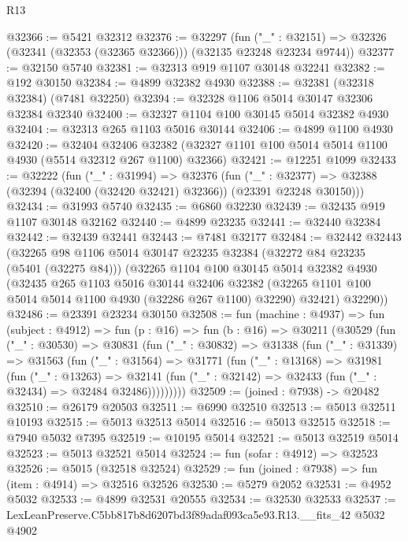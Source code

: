 \begin{lexlean}{R13}
\begin{coremodule}
@32366 := @5421 @32312
@32376 := @32297
    (fun ("_" : @32151) => @32326 (@32341 (@32353 (@32365 @32366))) (@32135 @23248 @23234 @9744))
@32377 := @32150 @5740
@32381 := @32313 @919 @1107 @30148 @32241
@32382 := @192 @30150
@32384 := @4899 @32382 @4930
@32388 := @32381 (@32318 @32384) (@7481 @32250)
@32394 := @32328 @1106 @5014 @30147 @32306 @32384 @32340
@32400 := @32327 @1104 @100 @30145 @5014 @32382 @4930
@32404 := @32313 @265 @1103 @5016 @30144
@32406 := @4899 @1100 @4930
@32420 := @32404
    @32406
    @32382
    (@32327 @1101 @100 @5014 @5014 @1100 @4930 (@5514 @32312 @267 @1100) @32366)
@32421 := @12251 @1099
@32433 := @32222
    (fun ("_" : @31994) =>
    @32376
      (fun ("_" : @32377) =>
      @32388 (@32394 (@32400 (@32420 @32421) @32366)) (@23391 @23248 @30150)))
@32434 := @31993 @5740
@32435 := @6860 @32230
@32439 := @32435 @919 @1107 @30148 @32162
@32440 := @4899 @23235
@32441 := @32440 @32384
@32442 := @32439 @32441
@32443 := @7481 @32177
@32484 := @32442
    @32443
    (@32265
      @98
      @1106
      @5014
      @30147
      @23235
      @32384
      (@32272 @84 @23235 (@5401 (@32275 @84)))
      (@32265
        @1104
        @100
        @30145
        @5014
        @32382
        @4930
        (@32435
          @265
          @1103
          @5016
          @30144
          @32406
          @32382
          (@32265 @1101 @100 @5014 @5014 @1100 @4930 (@32286 @267 @1100) @32290)
          @32421)
        @32290))
@32486 := @23391 @23234 @30150
@32508 := fun (machine : @4937) =>
  fun (subject : @4912) =>
  fun (p : @16) =>
  fun (b : @16) =>
  @30211
    (@30529
      (fun ("_" : @30530) =>
      @30831
        (fun ("_" : @30832) =>
        @31338
          (fun ("_" : @31339) =>
          @31563
            (fun ("_" : @31564) =>
            @31771
              (fun ("_" : @13168) =>
              @31981
                (fun ("_" : @13263) =>
                @32141 (fun ("_" : @32142) => @32433 (fun ("_" : @32434) => @32484 @32486)))))))))
@32509 := (joined : @7938) -> @20482
@32510 := @26179 @20503
@32511 := @6990 @32510
@32513 := @5013 @32511 @10193
@32515 := @5013 @32513 @5014
@32516 := @5013 @32515
@32518 := @7940 @5032 @7395
@32519 := @10195 @5014
@32521 := @5013 @32519 @5014
@32523 := @5013 @32521 @5014
@32524 := fun (sofar : @4912) => @32523
@32526 := @5015 (@32518 @32524)
@32529 := fun (joined : @7938) => fun (item : @4914) => @32516 @32526
@32530 := @5279 @2052
@32531 := @4952 @5032
@32533 := @4899 @32531 @20555
@32534 := @32530 @32533
@32537 := LexLeanPreserve.C5bb817b8d6207bd3f89adaf093ca5e93.R13.__fits_42 @5032 @4902

\end{coremodule}
\end{lexlean}
